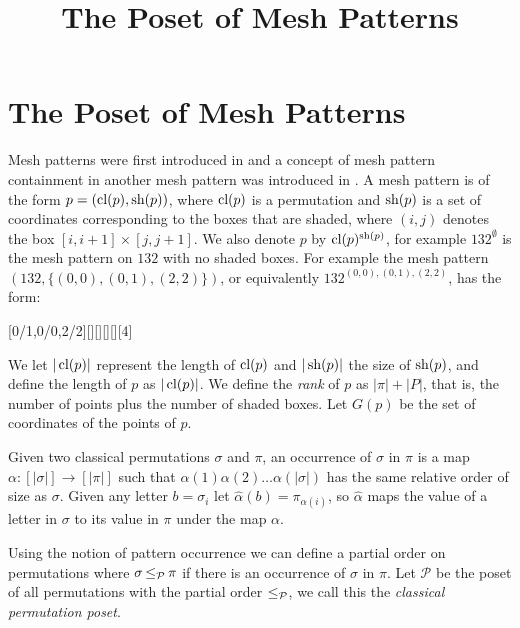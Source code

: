 \documentclass[11pt,a4paper,oneside]{article}
\title{The Poset of Mesh Patterns}
\begin{document}
	\maketitle



\section{The Poset of Mesh Patterns}

Mesh patterns were first introduced in \cite{Bra11} and a concept of mesh
pattern containment in another mesh pattern was introduced in \cite{TU17}. A
mesh pattern is of the form $p=(\operatorname{\textrm{cl}}(p),\operatorname{\textrm{sh}}(p))$, where $\operatorname{\textrm{cl}}(p)$ is a permutation
and $\operatorname{\textrm{sh}}(p)$ is a set of coordinates corresponding to the boxes that are shaded,
where $(i,j)$ denotes the box $[i,i+1]\times[j,j+1]$. We
also denote $p$ by $\operatorname{\textrm{cl}}(p)^{\operatorname{\textrm{sh}}(p)}$, for example $132^\emptyset$ is the mesh
pattern on $132$ with no shaded boxes.  For example the mesh pattern
$(132,\{(0,0),(0,1),(2,2)\})$, or equivalently $132^{(0,0),(0,1),(2,2)}$, has the form:

\begin{center}
[0/1,0/0,2/2][][][][][4]
\end{center}

We let $|\operatorname{\textrm{cl}}(p)|$ represent the length of $\operatorname{\textrm{cl}}(p)$ and $|\operatorname{\textrm{sh}}(p)|$ the size of
$\operatorname{\textrm{sh}}(p)$, and define the length of $p$ as $|\operatorname{\textrm{cl}}(p)|$. We define the \emph{rank}
of $p$ as $|\pi|+|P|$, that is, the number of points plus the number of shaded
boxes. Let $G(p)$ be the set of coordinates of
the points of $p$.

Given two classical permutations $\sigma$ and $\pi$, an occurrence of $\sigma$
in $\pi$ is a map $\alpha:[|\sigma|]\rightarrow[|\pi|]$ such that
$\alpha(1)\alpha(2)\ldots\alpha(|\sigma|)$ has the same relative order of size
as $\sigma$. Given any letter $b=\sigma_i$ let
$\hat{\alpha}(b)=\pi_{\alpha(i)}$, so $\hat{\alpha}$ maps the value of a letter
in $\sigma$ to its value in $\pi$ under the map $\alpha$.

Using the notion of pattern occurrence we can define a partial order on
permutations where $\sigma\operatorname{\le_{\mathcal{P}}}\pi$ if there is an occurrence of $\sigma$ in
$\pi$. Let $\mathcal{P}$ be the poset of all permutations with the partial order
$\operatorname{\le_{\mathcal{P}}}$, we call this the \emph{classical permutation poset}.
\end{document}
